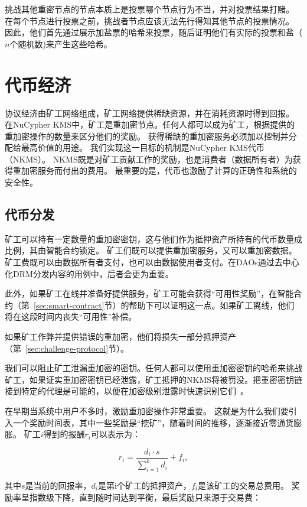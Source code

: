 \documentclass[longbibliography,nofootinbib]{revtex4-1}
\newcommand{\kms}{NuCypher KMS}
\begin{document}
    挑战其他重密节点的节点本质上是投票哪个节点行为不当，并对投票结果打赌。 在每个节点进行投票之前，挑战者节点应该无法先行得知其他节点的投票情况。 因此，他们首先通过展示加盐票的哈希来投票，随后证明他们有实际的投票和盐（$n$个随机数)来产生这些哈希。

\section{代币经济}
\label{sec:token}

协议经济由矿工网络组成，矿工网络提供稀缺资源，并在消耗资源时得到回报。 在\kms 中，矿工是重加密节点。任何人都可以成为矿工，根据提供的重加密操作的数量来区分他们的奖励。 获得稀缺的重加密服务必须加以控制并分配给最高价值的用途。 我们实现这一目标的机制是\kms 代币（NKMS）。 NKMS既是对矿工贡献工作的奖励，也是消费者（数据所有者）为获得重加密服务而付出的费用。 最重要的是，代币也激励了计算的正确性和系统的安全性。

\subsection{代币分发}

        矿工可以持有一定数量的重加密密钥，这与他们作为抵押资产所持有的代币数量成比例，其由智能合约锁定。 矿工们既可以提供重加密服务，又可以重加密数据。矿工费既可以由数据所有者支付，也可以由数据使用者支付。在DAOs通过去中心化DRM分发内容的用例中，后者会更为重要。
    
        此外，如果矿工在线并准备好提供服务，矿工可能会获得“可用性奖励”，在智能合约（第~\ref{sec:smart-contract}节）的帮助下可以证明这一点。如果矿工离线，他们将在这段时间内丧失“可用性”补偿。
    
        如果矿工作弊并提供错误的重加密，他们将损失一部分抵押资产（第~\ref{sec:challenge-protocol}节）。
    
    我们可以阻止矿工泄漏重加密的密钥。任何人都可以使用重加密密钥的哈希来挑战矿工，如果证实重加密密钥已经泄露，矿工抵押的NKMS将被罚没。把重密密钥链接到特定的代理是可能的，以便在加密级别泄露时快速识别它们~\cite{Libert2008}。
    
    在早期当系统中用户不多时，激励重加密操作非常重要。 这就是为什么我们要引入一个奖励时间表，其中一些奖励是“挖矿”，随着时间的推移，逐渐接近零通货膨胀。 矿工$i$得到的报酬$r_i$可以表示为：
    
\begin{equation}
    r_i = \frac{d_i \cdot s}{\sum_{i=1}^k d_i} + f_i,
\end{equation}

        其中$s$是当前的回报率，$d_i$是第i个矿工的抵押资产，$f_i$是该矿工的交易总费用。 奖励率呈指数级下降，直到随时间达到平衡，最后奖励只来源于交易费：
    
\end{document}
